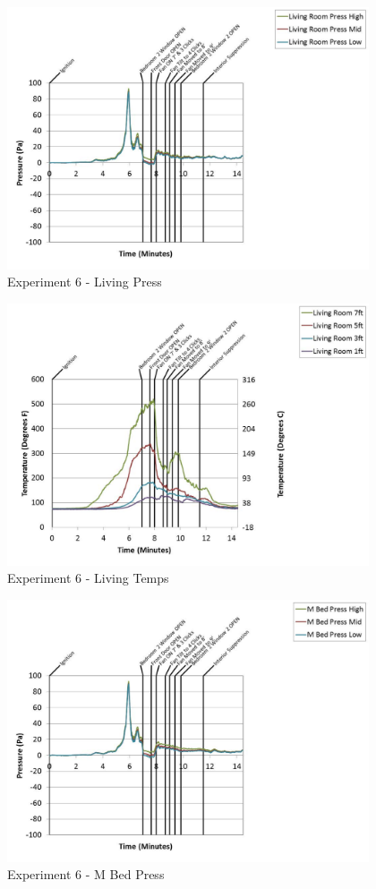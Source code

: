\documentclass{article}
\begin{document}
\begin{appendices}
	\begin{figure}[h!]
		\centering
		\includegraphics[height=3.05in]{0_Images/Results_Charts/Exp_6_Charts/LivingPress.pdf}
		\caption{Experiment 6 - Living Press}
	\end{figure}
 
	\clearpage

	\begin{figure}[h!]
		\centering
		\includegraphics[height=3.05in]{0_Images/Results_Charts/Exp_6_Charts/LivingTemps.pdf}
		\caption{Experiment 6 - Living Temps}
	\end{figure}
 

	\begin{figure}[h!]
		\centering
		\includegraphics[height=3.05in]{0_Images/Results_Charts/Exp_6_Charts/MBedPress.pdf}
		\caption{Experiment 6 - M Bed Press}
	\end{figure}
 

\end{appendices}
\end{document}

